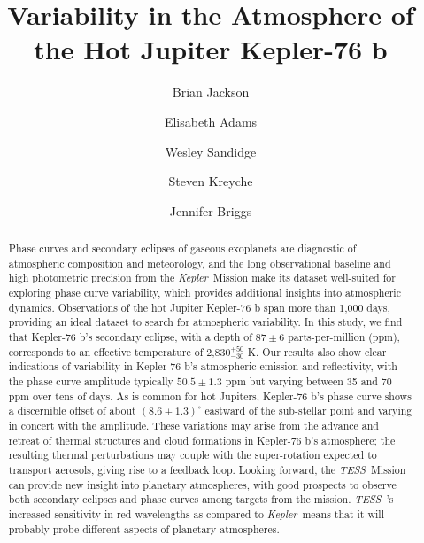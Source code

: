 \documentclass[manuscript]{aastex62}
\newcommand{\kepler}{{\it Kepler}}
\newcommand{\tess}{{\it TESS}}
\begin{document}
\title{Variability in the Atmosphere of the Hot Jupiter Kepler-76 b}


\author{Brian Jackson}

\author{Elisabeth Adams}

\author{Wesley Sandidge}

\author{Steven Kreyche}

\author{Jennifer Briggs}





\begin{abstract}
Phase curves and secondary eclipses of gaseous exoplanets are diagnostic of atmospheric composition and meteorology, and the long observational baseline and high photometric precision from the \kepler\ Mission make its dataset well-suited for exploring phase curve variability, which provides additional insights into atmospheric dynamics. Observations of the hot Jupiter Kepler-76 b span more than 1,000 days, providing an ideal dataset to search for atmospheric variability. In this study, we find that Kepler-76 b's secondary eclipse, with a depth of $87 \pm 6$ parts-per-million (ppm), corresponds to an effective temperature of 2,830$^{+50}_{-30}$ K. Our results also show clear indications of variability in Kepler-76 b's atmospheric emission and reflectivity, with the phase curve amplitude typically $50.5 \pm 1.3$ ppm but varying between 35 and 70 ppm over tens of days. As is common for hot Jupiters, Kepler-76 b's phase curve shows a discernible offset of about $\left( 8.6 \pm 1.3 \right)^\circ$ eastward of the sub-stellar point and varying in concert with the amplitude. These variations may arise from the advance and retreat of thermal structures and cloud formations in Kepler-76 b's atmosphere; the resulting thermal perturbations may couple with the super-rotation expected to transport aerosols, giving rise to a feedback loop. Looking forward, the \tess\ Mission can provide new insight into planetary atmospheres, with good prospects to observe both secondary eclipses and phase curves among targets from the mission. \tess\ 's increased sensitivity in red wavelengths as compared to \kepler\ means that it will probably probe different aspects of planetary atmospheres.

\end{abstract}
\end{document}
